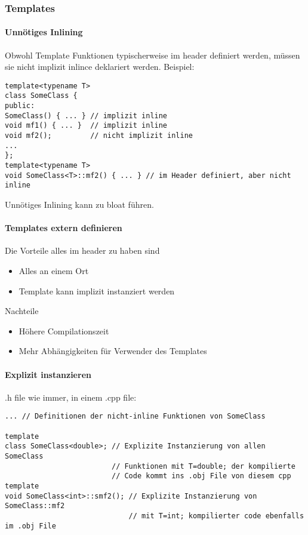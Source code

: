 \subsubsection{Templates}
\paragraph{Unnötiges Inlining}
Obwohl Template Funktionen typischerweise im header definiert werden, müssen sie nicht implizit inlince deklariert werden. Beispiel:
\begin{lstlisting}
template<typename T>
class SomeClass {
public:
SomeClass() { ... } // implizit inline
void mf1() { ... }  // implizit inline
void mf2();         // nicht implizit inline
...
};
template<typename T>
void SomeClass<T>::mf2() { ... } // im Header definiert, aber nicht inline
\end{lstlisting}
Unnötiges Inlining kann zu bloat führen.

\paragraph{Templates extern definieren}
Die Vorteile alles im header zu haben sind
\begin{itemize}
	\item Alles an einem Ort
	\item Template kann implizit instanziert werden
\end{itemize}
Nachteile
\begin{itemize}
	\item Höhere Compilationszeit
	\item Mehr Abhängigkeiten für Verwender des Templates
\end{itemize}

\paragraph{Explizit instanzieren}
.h file wie immer, in einem .cpp file:
\begin{lstlisting}
... // Definitionen der nicht-inline Funktionen von SomeClass

template
class SomeClass<double>; // Explizite Instanzierung von allen SomeClass
                         // Funktionen mit T=double; der kompilierte
                         // Code kommt ins .obj File von diesem cpp
template
void SomeClass<int>::smf2(); // Explizite Instanzierung von SomeClass::mf2
                             // mit T=int; kompilierter code ebenfalls im .obj File
\end{lstlisting}

